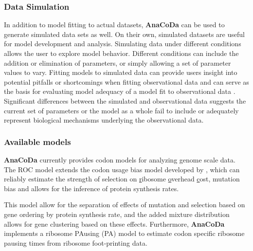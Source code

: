 \documentclass{bioinfo}
\newcommand{\package}{\textbf{AnaCoDa }} %
\begin{document}
\subsubsection*{Data Simulation}
In addition to model fitting to actual datasets, \package can be used to generate simulated data sets as well.
On their own, simulated datasets are useful for model development and analysis.
Simulating data under different conditions allows the user to explore model behavior. 
Different conditions can include the addition or elimination of parameters, or simply allowing a set of parameter values to vary.
Fitting models to simulated data can provide users insight into potential pitfalls or shortcomings when fitting observational data and can serve as the basis for evaluating model adequacy of a model fit to observational data \citep{gumi2015}.
Significant differences between the simulated and observational data suggests the current set of parameters or the model as a whole fail to include or adequately represent biological mechanisms underlying the observational data.
 
\subsubsection*{Available models}
\package currently provides codon models for analyzing genome scale data.
The ROC model extends the codon usage bias model developed by \citet{gilchrist2015,wallace2013,shah2011}, which can reliably estimate the strength of selection on \underline{r}ibosome \underline{o}verhead \underline{c}ost, mutation bias and allows for the inference of protein synthesis rates.

This model allow for the separation of effects of mutation and selection based on gene ordering by protein synthesis rate, and the added mixture distribution allows for gene clustering based on these effects.
Furthermore, \package implements a ribosome PAusing (PA) model to estimate codon specific ribosome pausing times from ribosome foot-printing data.





\end{document}
